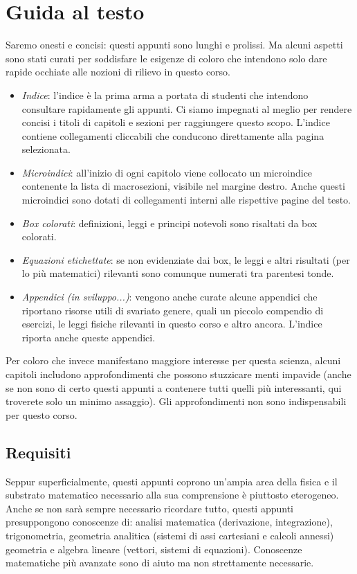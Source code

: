 \chapter*{Guida al testo}
Saremo onesti e concisi: questi appunti sono lunghi e prolissi.
Ma alcuni aspetti sono stati curati per soddisfare le esigenze di
coloro che intendono solo dare rapide occhiate alle nozioni di rilievo
in questo corso.

\begin{itemize}
    \item \textit{Indice}: l'indice è la prima arma a portata di studenti che intendono
    consultare rapidamente gli appunti. Ci siamo impegnati al meglio per rendere
    concisi i titoli di capitoli e sezioni per raggiungere questo scopo. L'indice
    contiene collegamenti cliccabili che conducono direttamente alla pagina selezionata.

    \item \textit{Microindici}: all'inizio di ogni capitolo viene collocato un microindice
    contenente la lista di macrosezioni, visibile nel margine destro. Anche questi microindici
    sono dotati di collegamenti interni alle rispettive pagine del testo.

    \item \textit{Box colorati}: definizioni, leggi e principi notevoli sono risaltati da box colorati.
    
    \item \textit{Equazioni etichettate}: se non evidenziate dai box, le leggi e altri
    risultati (per lo più matematici) rilevanti sono comunque numerati tra
    parentesi tonde.

    \item \textit{Appendici (in sviluppo...)}: vengono anche curate alcune appendici
    che riportano risorse utili di svariato genere, quali un piccolo compendio di esercizi,
    le leggi fisiche rilevanti in questo corso e altro ancora. L'indice riporta anche
    queste appendici.
\end{itemize}

Per coloro che invece manifestano maggiore interesse per questa scienza, alcuni
capitoli includono approfondimenti che possono stuzzicare menti impavide (anche
se non sono di certo questi appunti a contenere tutti quelli più interessanti,
qui troverete solo un minimo assaggio). Gli approfondimenti non sono
indispensabili per questo corso.

\section*{Requisiti}
Seppur superficialmente, questi appunti coprono un'ampia area della fisica
e il substrato matematico necessario alla sua comprensione è piuttosto eterogeneo.
Anche se non sarà sempre necessario ricordare tutto,
questi appunti presuppongono conoscenze di: analisi matematica (derivazione,
integrazione), trigonometria, geometria analitica (sistemi di assi
cartesiani e calcoli annessi) geometria e algebra lineare (vettori,
sistemi di equazioni). Conoscenze matematiche più avanzate
sono di aiuto ma non strettamente necessarie.

